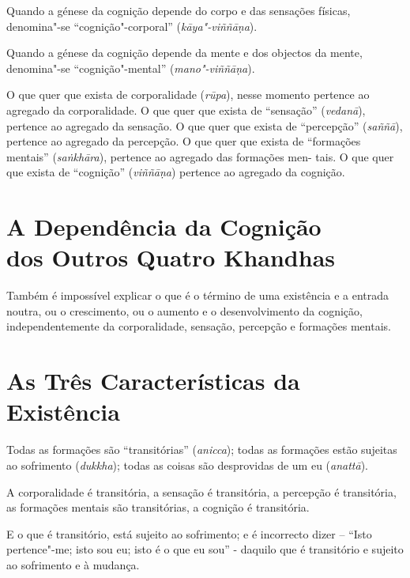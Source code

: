 Quando a génese da cognição depende do corpo e das sensações físicas,
denomina"-se ``cognição"-corporal'' (\emph{kāya"-viññāṇa}).

Quando a génese da cognição depende da mente e dos objectos da mente,
denomina"-se ``cognição"-mental'' (\emph{mano"-viññāṇa}).


O que quer que exista de corporalidade (\emph{rūpa}), nesse momento pertence ao
agregado da corporalidade. O que quer que exista de ``sensação''
(\emph{vedanā}), pertence ao agregado da sensação. O que quer que exista de
``percepção'' (\emph{saññā}), pertence ao agregado da percepção. O que quer que
exista de ``formações mentais'' (\emph{saṅkhāra}), pertence ao agregado das
formações men- tais. O que quer que exista de ``cognição'' (\emph{viññāṇa})
pertence ao agregado da cognição.


\section{A Dependência da Cognição\\ dos Outros Quatro Khandhas}

Também é impossível explicar o que é o término de uma existência e a entrada
noutra, ou o crescimento, ou o aumento e o desenvolvimento da cognição,
independentemente da corporalidade, sensação, percepção e formações mentais.


\clearpage

\section{As Três Características da Existência}


Todas as formações são ``transitórias'' (\emph{anicca}); todas as formações
estão sujeitas ao sofrimento (\emph{dukkha}); todas as coisas são desprovidas de
um eu (\emph{anattā}).


A corporalidade é transitória, a sensação é transitória, a percepção é
transitória, as formações mentais são transitórias, a cognição é transitória.

E o que é transitório, está sujeito ao sofrimento; e é incorrecto dizer --
``Isto pertence"-me; isto sou eu; isto é o que eu sou'' - daquilo que é
transitório e sujeito ao sofrimento e à mudança.

